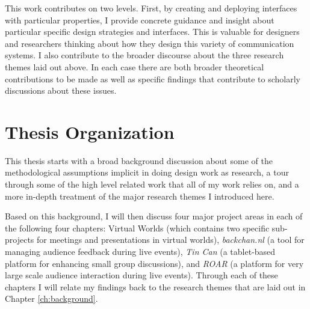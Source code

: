 This work contributes on two levels. First, by creating and deploying interfaces with particular properties, I provide concrete guidance and insight about particular specific design strategies and interfaces. This is valuable for designers and researchers thinking about how they design this variety of communication systems. I also contribute to the broader discourse about the three research themes laid out above. In each case there are both broader theoretical contributions to be made as well as specific findings that contribute to scholarly discussions about these issues.

\section{Thesis Organization}

This thesis starts with a broad background discussion about some of the methodological assumptions implicit in doing design work as research, a tour through some of the high level related work that all of my work relies on, and a more in-depth treatment of the major research themes I introduced here.

Based on this background, I will then discuss four major project areas in each of the following four chapters: Virtual Worlds (which contains two specific sub-projects for meetings and presentations in virtual worlds), \emph{backchan.nl} (a tool for managing audience feedback during live events), \emph{Tin Can} (a tablet-based platform for enhancing small group discussions), and \emph{ROAR} (a platform for very large scale audience interaction during live events). Through each of these chapters I will relate my findings back to the research themes that are laid out in Chapter \ref{ch:background}. 